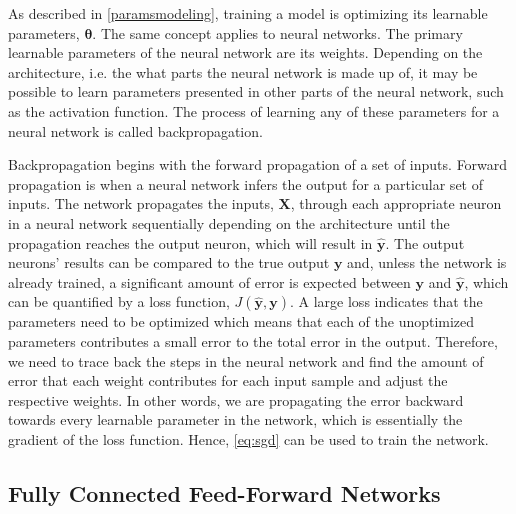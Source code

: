 As described in \cref{paramsmodeling}, training a model is optimizing its learnable parameters, $\boldsymbol{\theta}$. The same concept applies to neural networks. The primary learnable parameters of the neural network are its weights. Depending on the architecture, i.e. the what parts the neural network is made up of, it may be possible to learn parameters presented in other parts of the neural network, such as the activation function. The process of learning any of these parameters for a neural network is called backpropagation. 

Backpropagation begins with the forward propagation of a set of inputs. Forward propagation is when a neural network infers the output for a particular set of inputs. The network propagates the inputs, $\mathbf{X}$, through each appropriate neuron in a neural network sequentially depending on the architecture until the propagation reaches the output neuron, which will result in $\mathbf{\hat{y}}$. The output neurons' results can be compared to the true output $\mathbf{y}$ and, unless the network is already trained, a significant amount of error is expected between $\mathbf{y}$ and $\mathbf{\hat{y}}$, which can be quantified by a loss function, $J(\mathbf{\hat{y}}, \mathbf{y})$. A large loss indicates that the parameters need to be optimized which means that each of the unoptimized parameters contributes a small error to the total error in the output. Therefore, we need to trace back the steps in the neural network and find the amount of error that each weight contributes for each input sample and adjust the respective weights. In other words, we are propagating the error backward towards every learnable parameter in the network, which is essentially the gradient of the loss function. Hence, \cref{eq:sgd} can be used to train the network. 


\subsection{Fully Connected Feed-Forward Networks}

